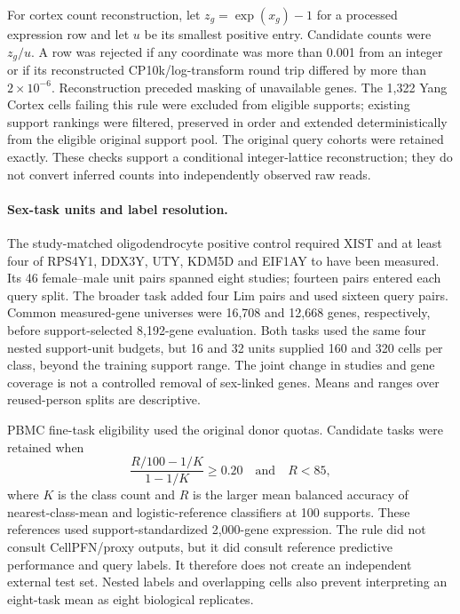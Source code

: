 For cortex count reconstruction, let $z_g=\exp(x_g)-1$ for a processed expression row and let $u$ be its smallest positive entry. Candidate counts were $z_g/u$. A row was rejected if any coordinate was more than 0.001 from an integer or if its reconstructed CP10k/log-transform round trip differed by more than $2\times10^{-6}$. Reconstruction preceded masking of unavailable genes. The 1,322 Yang Cortex cells failing this rule were excluded from eligible supports; existing support rankings were filtered, preserved in order and extended deterministically from the eligible original support pool. The original query cohorts were retained exactly. These checks support a conditional integer-lattice reconstruction; they do not convert inferred counts into independently observed raw reads.

\paragraph{Sex-task units and label resolution.}
The study-matched oligodendrocyte positive control required XIST and at least four of RPS4Y1, DDX3Y, UTY, KDM5D and EIF1AY to have been measured. Its 46 female--male unit pairs spanned eight studies; fourteen pairs entered each query split. The broader task added four Lim pairs and used sixteen query pairs. Common measured-gene universes were 16,708 and 12,668 genes, respectively, before support-selected 8,192-gene evaluation. Both tasks used the same four nested support-unit budgets, but 16 and 32 units supplied 160 and 320 cells per class, beyond the training support range. The joint change in studies and gene coverage is not a controlled removal of sex-linked genes. Means and ranges over reused-person splits are descriptive.

PBMC fine-task eligibility used the original donor quotas. Candidate tasks were retained when
\[
 \frac{R/100-1/K}{1-1/K}\geq0.20\quad\text{and}\quad R<85,
\]
where $K$ is the class count and $R$ is the larger mean balanced accuracy of nearest-class-mean and logistic-reference classifiers at 100 supports. These references used support-standardized 2,000-gene expression. The rule did not consult CellPFN/proxy outputs, but it did consult reference predictive performance and query labels. It therefore does not create an independent external test set. Nested labels and overlapping cells also prevent interpreting an eight-task mean as eight biological replicates.

